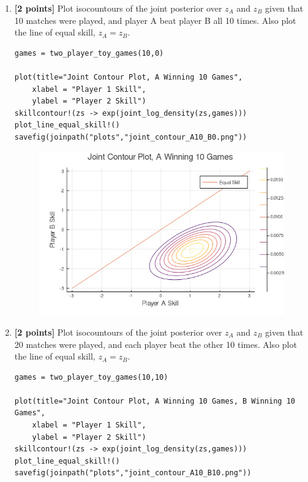 \documentclass{article}
\begin{document}
\begin{enumerate}[label=(\alph*)]
\pagebreak

\item {\bf [2 points]}  Plot isocountours of the joint posterior over $z_A$ and $z_B$ given that
10 matches were played, and player A beat player B all 10 times.
Also plot the line of equal skill, $z_A = z_B$.

\begin{verbatim}
games = two_player_toy_games(10,0)

plot(title="Joint Contour Plot, A Winning 10 Games",
    xlabel = "Player 1 Skill",
    ylabel = "Player 2 Skill")
skillcontour!(zs -> exp(joint_log_density(zs,games)))
plot_line_equal_skill!()
savefig(joinpath("plots","joint_contour_A10_B0.png"))
\end{verbatim}

\begin{figure}[h]
  \centering
  \includegraphics[width=12cm,keepaspectratio]{plots/joint_contour_A10_B0.png}
\end{figure}

\pagebreak

\item {\bf [2 points]}  Plot isocountours of the joint posterior over $z_A$ and $z_B$ given that
20 matches were played, and each player beat the other 10 times.
Also plot the line of equal skill, $z_A = z_B$.

\begin{verbatim}
games = two_player_toy_games(10,10)

plot(title="Joint Contour Plot, A Winning 10 Games, B Winning 10 Games",
    xlabel = "Player 1 Skill",
    ylabel = "Player 2 Skill")
skillcontour!(zs -> exp(joint_log_density(zs,games)))
plot_line_equal_skill!()
savefig(joinpath("plots","joint_contour_A10_B10.png"))
\end{verbatim}


\end{enumerate}
\end{document}
